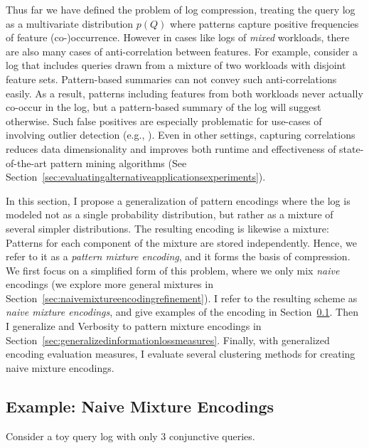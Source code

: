 \label{sec:patternmixtureencodings}
Thus far we have defined the problem of log compression, treating the query log as a multivariate distribution $p(Q)$ where patterns capture positive frequencies of feature (co-)occurrence.
However in cases like logs of \textit{mixed} workloads, there are also many cases of anti-correlation between features.
For example, consider a log that includes queries drawn from a mixture of two workloads with disjoint feature sets.
Pattern-based summaries can not convey such anti-correlations easily.
As a result, patterns including features from both workloads never actually co-occur in the log, but a pattern-based summary of the log will suggest otherwise.
Such false positives are especially problematic for use-cases of \systemnameone involving outlier detection (e.g., \cite{DBLP:conf/trustcom/KulUC18}).
Even in other settings, capturing correlations reduces data dimensionality and improves both runtime and effectiveness of state-of-the-art pattern mining algorithms (See Section~\ref{sec:evaluatingalternativeapplicationsexperiments}).

In this section, I propose a generalization of pattern encodings where the log is modeled not as a single probability distribution, but rather as a mixture of several simpler distributions.
The resulting encoding is likewise a mixture: Patterns for each component of the mixture are stored independently.
Hence, we refer to it as a \emph{pattern mixture encoding}, and it forms the basis of \systemnameone compression.
We first focus on a simplified form of this problem, where we only mix \emph{naive} encodings (we explore more general mixtures in Section~\ref{sec:naivemixtureencodingrefinement}).
I refer to the resulting scheme as \textit{naive mixture encodings}, and give examples of the encoding in Section~\ref{sec:naivemixtureencoding}.
Then I generalize \errorname and Verbosity to pattern mixture encodings in Section~\ref{sec:generalizedinformationlossmeasures}.
Finally, with generalized encoding evaluation measures, I evaluate several clustering methods for creating naive mixture encodings.

\subsection{Example: Naive Mixture Encodings}
\label{sec:naivemixtureencoding}
\noindent Consider a toy query log with only 3 conjunctive queries. \\[-5mm]

